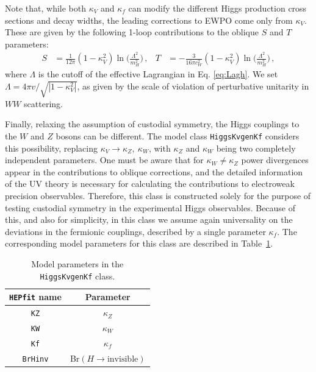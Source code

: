 \documentclass[preprint,3p,12pt]{elsarticle}
\newcommand{\HEPfit}{\texttt{HEPfit}\xspace}
\begin{document}
Note that, while both $\kappa_V$ and $\kappa_f$ can modify the different Higgs production cross sections and decay widths, the leading corrections to EWPO come only from $\kappa_V$. These are given by the following 1-loop contributions to the oblique $S$ and $T$ parameters:
%
\begin{align}
S &= \frac{1}{12\pi} (1 - \kappa_V^2)
  \ln\bigg(\frac{\Lambda^2}{m_H^2}\bigg)\,,
&
T &= - \frac{3}{16\pi c_W^2} (1 - \kappa_V^2)
  \ln\bigg(\frac{\Lambda^2}{m_H^2}\bigg)\,,
\label{eq:ST}
\end{align}
where $\Lambda$ is the cutoff of the effective Lagrangian in Eq. \ref{eq:Lagh}.
We set $\Lambda = 4\pi v/\sqrt{|1-\kappa_V^2|}$, as given by the scale of 
violation of perturbative unitarity in $WW$ scattering.

Finally, relaxing the assumption of custodial symmetry, the Higgs couplings to the $W$ and $Z$ bosons can be different. The model class {\tt HiggsKvgenKf} considers this possibility, replacing $\kappa_V\rightarrow \kappa_Z,~\kappa_W$, with $\kappa_Z$ and $\kappa_W$ being two completely independent parameters. One must be aware that for $\kappa_W\not = \kappa_Z$ power divergences appear in the contributions to oblique corrections, and the detailed information of the UV theory is necessary for calculating the contributions to electroweak precision observables.
Therefore, this class is constructed solely for the purpose of testing custodial symmetry in the experimental Higgs observables. Because of this, and also for simplicity, in this class we assume again universality on the deviations in the fermionic couplings, described by a single parameter $\kappa_f$. The corresponding model parameters for this class are described in Table~\ref{tab:HiggsKvgenKfpars}.

\begin{table}[tb]
 \centering
 \caption{Model parameters in the {\tt HiggsKvgenKf} class.}\vspace{0.2cm}
  \begin{tabular}{| c c | }
\hline
%
\textbf{\HEPfit name}&
\textbf{Parameter}\\
%
\hline
 {\tt KZ}&
$\kappa_Z$\\
%
 {\tt KW}&
$\kappa_W$\\
%
 {\tt Kf}&
$\kappa_f$\\
%
 {\tt BrHinv}&
Br$(H\to \mathrm{invisible})$\\
\hline
  \end{tabular}
 \label{tab:HiggsKvgenKfpars}
\end{table} 
\end{document}
